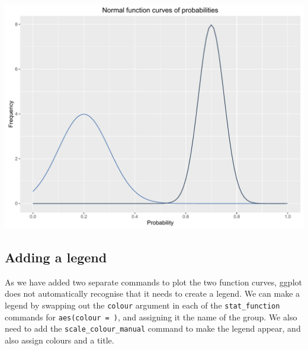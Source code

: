 \documentclass[]{article}
\begin{document}
\begin{center}\includegraphics{0_all_posts_pdf/function_9-1} \end{center}

\subsection{Adding a legend}\label{adding-a-legend}

As we have added two separate commands to plot the two function curves,
ggplot does not automatically recognise that it needs to create a
legend. We can make a legend by swapping out the \texttt{colour}
argument in each of the \texttt{stat\_function} commands for
\texttt{aes(colour\ =\ )}, and assigning it the name of the group. We
also need to add the \texttt{scale\_colour\_manual} command to make the
legend appear, and also assign colours and a title.
\end{document}
